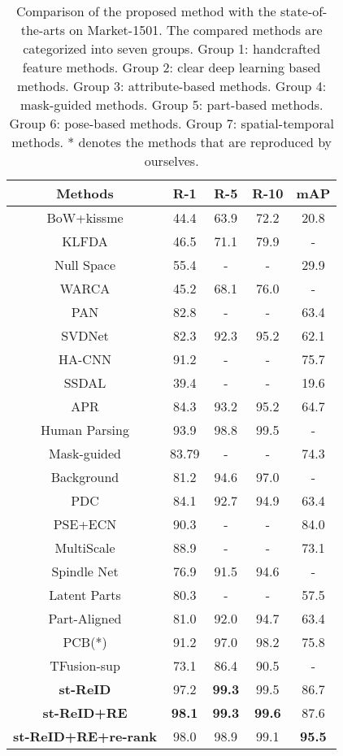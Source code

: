 \documentclass[letterpaper]{article} \usepackage{aaai19}  \usepackage{times}  \usepackage{helvet}  \usepackage{courier}  \usepackage{url}  \usepackage{graphicx}  \usepackage{subfig}
\begin{document}
\begin{table}
\begin{center}
\begin{tabular}{c|c|c|c|c}
\hline
Methods &R-1&R-5&R-10&mAP \\
\hline
BoW+kissme&44.4&63.9&72.2&20.8\\
KLFDA&46.5&71.1&79.9&-\\
Null Space&55.4&-&-&29.9\\
WARCA &45.2&68.1&76.0&-\\
\hline
PAN&82.8&-&-&63.4\\
SVDNet&82.3&92.3&95.2&62.1\\
HA-CNN&91.2&-&-&75.7\\
\hline
SSDAL&39.4&-&-&19.6\\
APR&84.3&93.2&95.2&64.7\\
\hline
Human Parsing&93.9&98.8&99.5&-\\
Mask-guided&83.79&-&-&74.3\\
Background&81.2&94.6&97.0&-\\
\hline
PDC &84.1&92.7&94.9&63.4\\
PSE+ECN&90.3&-&-&84.0\\
\hline
MultiScale&88.9&-&-&73.1\\
Spindle Net &76.9&91.5&94.6&-\\
Latent Parts&80.3&-&-&57.5\\
Part-Aligned&81.0&92.0&94.7&63.4\\
PCB(*) &91.2&97.0&98.2&75.8\\
\hline
TFusion-sup&73.1&86.4&90.5&-\\
\hline
\textbf{st-ReID}&97.2&\textbf{99.3}&99.5&86.7\\
\textbf{st-ReID+RE}&\textbf{98.1}&\textbf{99.3}&\textbf{99.6}&87.6\\
\textbf{st-ReID+RE+re-rank}&98.0&98.9&99.1&\textbf{95.5}\\
\hline
\end{tabular}
\end{center}
\caption{Comparison of the proposed method with the state-of-the-arts on Market-1501. The compared methods are categorized into seven groups. Group 1: handcrafted feature methods. Group 2: clear deep learning based methods. Group 3: attribute-based methods. Group 4: mask-guided methods. Group 5: part-based methods. Group 6: pose-based methods. Group 7: spatial-temporal methods. * denotes the methods that are reproduced by ourselves.}\label{tab:market1501}
\end{table}
\end{document}
